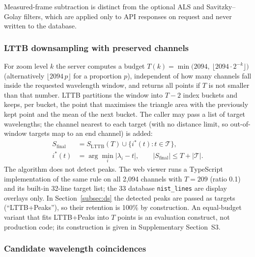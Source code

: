 \documentclass[final,5p,twocolumn,a4paper]{elsarticle}
\begin{document}
Measured-frame subtraction is distinct from the optional ALS \cite{eilers2003perfect} and Savitzky--Golay \cite{savitzky1964} filters, which are applied only to API responses on request and never written to the database.

\subsubsection{LTTB downsampling with preserved channels}
\label{subsec:lttb}

For zoom level $k$ the server computes a budget $T(k)=\min\!\bigl(2094,\ \lfloor 2094\cdot2^{-k}\rfloor\bigr)$ (alternatively $\lfloor 2094\,p\rfloor$ for a proportion $p$), independent of how many channels fall inside the requested wavelength window, and returns all points if $T$ is not smaller than that number. LTTB \cite{steinarsson2013lttb} partitions the window into $T-2$ index buckets and keeps, per bucket, the point that maximises the triangle area with the previously kept point and the mean of the next bucket. The caller may pass a list of target wavelengths; the channel nearest to each target (with no distance limit, so out-of-window targets map to an end channel) is added:
\begin{equation}
\begin{aligned}
S_{\mathrm{final}} &= S_{\mathrm{LTTB}}(T) \cup \{i^{*}(t) : t \in \mathcal{T}\},\\
i^{*}(t) &= \arg\min_i |\lambda_i - t|,\qquad |S_{\mathrm{final}}| \le T + |\mathcal{T}|.
\end{aligned}
\end{equation}
The algorithm does not detect peaks. The web viewer runs a TypeScript implementation of the same rule on all 2,094 channels with $T=209$ (ratio 0.1) and its built-in 32-line target list; the 33 database \texttt{nist\_lines} are display overlays only. In Section~\ref{subsec:ds} the detected peaks are passed as targets (``LTTB+Peaks''), so their retention is 100\% by construction. An equal-budget variant that fits LTTB+Peaks into $T$ points is an evaluation construct, not production code; its construction is given in Supplementary Section~S3.

\subsubsection{Candidate wavelength coincidences}
\label{subsec:nist}
\end{document}
